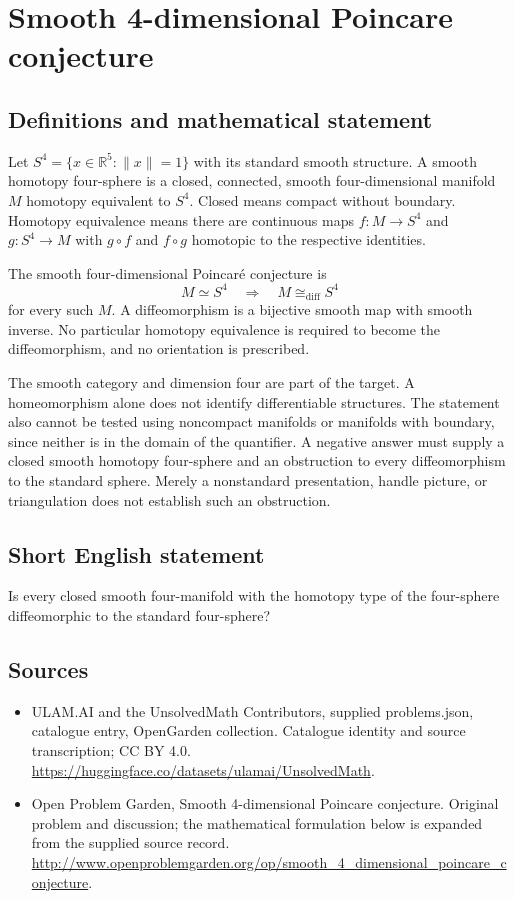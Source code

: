 \documentclass[11pt,a4paper]{article}
\begin{document}
\section*{Smooth 4-dimensional Poincare conjecture}\label{statement}

\subsection{Definitions and mathematical statement}
Let $S^4=\{x\in\mathbb R^5:\|x\|=1\}$ with its standard smooth
structure. A smooth homotopy four-sphere is a closed, connected,
smooth four-dimensional manifold $M$ homotopy equivalent to $S^4$.
Closed means compact without boundary. Homotopy equivalence means
there are continuous maps $f:M\to S^4$ and $g:S^4\to M$ with
$g\circ f$ and $f\circ g$ homotopic to the respective identities.

The smooth four-dimensional Poincar\'e conjecture is
\[
 M\simeq S^4\quad\Longrightarrow\quad
                    M\cong_{\mathrm{diff}}S^4
\]
for every such $M$. A diffeomorphism is a bijective smooth map with
smooth inverse. No particular homotopy equivalence is required to
become the diffeomorphism, and no orientation is prescribed.

The smooth category and dimension four are part of the target.
A homeomorphism alone does not identify differentiable structures.
The statement also cannot be tested using noncompact manifolds or
manifolds with boundary, since neither is in the domain of the
quantifier. A negative answer must supply a closed smooth homotopy
four-sphere and an obstruction to every diffeomorphism to the
standard sphere. Merely a nonstandard presentation, handle picture,
or triangulation does not establish such an obstruction.
\subsection{Short English statement}
Is every closed smooth four-manifold with the homotopy type of the four-sphere diffeomorphic to the standard four-sphere?
\subsection{Sources}
\begin{itemize}
\item[S1] ULAM.AI and the UnsolvedMath Contributors, supplied problems.json, catalogue entry, OpenGarden collection. Catalogue identity and source transcription; CC BY 4.0.
\url{https://huggingface.co/datasets/ulamai/UnsolvedMath}.
\item[S2] Open Problem Garden, Smooth 4-dimensional Poincare conjecture. Original problem and discussion; the mathematical formulation below is expanded from the supplied source record.
\url{http://www.openproblemgarden.org/op/smooth_4_dimensional_poincare_conjecture}.
\end{itemize}
\end{document}

